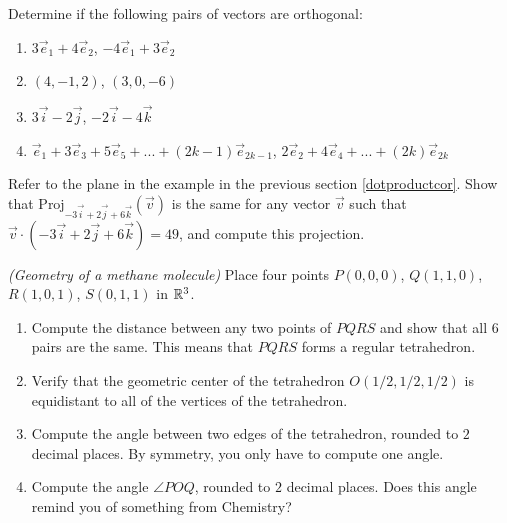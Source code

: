 \begin{exerciselist}
	\item Determine if the following pairs of vectors are orthogonal: \begin{enumerate}[label=(\alph*)]
		\item $3\vec{e}_1+4\vec{e}_2$, $-4\vec{e}_1+3\vec{e}_2$
		\item $(4,-1,2)$, $(3,0,-6)$
		\item $3\vec{i}-2\vec{j}$, $-2\vec{i}-4\vec{k}$
		\item $\vec{e}_1 + 3\vec{e}_3 + 5\vec{e}_5+ ...+(2k-1)\vec{e}_{2k-1}$, $2\vec{e}_2+4\vec{e}_4+...+(2k)\vec{e}_{2k}$
	\end{enumerate}
	\item Refer to the plane in the example in the previous section \ref{dotproductcor}. Show that $\textrm{Proj}_{-3\vec{i}+2\vec{j}+6\vec{k}}(\vec{v})$ is the same for any vector $\vec{v}$ such that $\vec{v}\cdot(-3\vec{i}+2\vec{j}+6\vec{k}) =49$, and compute this projection.
	\item \textit{(Geometry of a methane molecule)} Place four points $P(0,0,0)$, $Q(1,1,0)$, $R(1,0,1)$, $S(0,1,1)$ in $\mathbb{R}^3$. \begin{enumerate}[label=(\alph*)]
		\item Compute the distance between any two points of $PQRS$ and show that all $6$ pairs are the same. This means that $PQRS$ forms a regular tetrahedron.
		\item  Verify that the geometric center of the tetrahedron $O(1/2, 1/2, 1/2)$ is equidistant to all of the vertices of the tetrahedron.
		\item Compute the angle between two edges of the tetrahedron, rounded to $2$ decimal places. By symmetry, you only have to compute one angle.
		\item Compute the angle $\angle POQ$, rounded to $2$ decimal places. Does this angle remind you of something from Chemistry?
	\end{enumerate}
\end{exerciselist}
